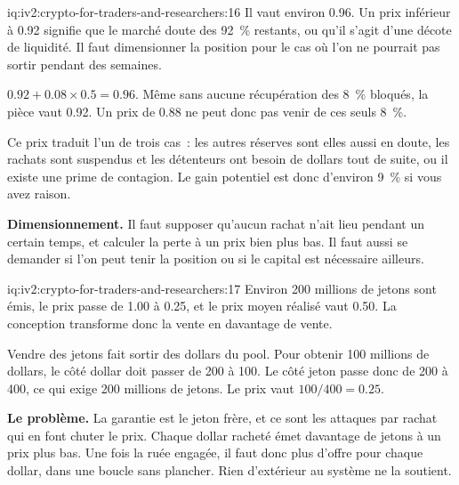 \begin{solution}{iq:iv2:crypto-for-traders-and-researchers:16}
Il vaut environ 0.96. Un prix inférieur à 0.92 signifie que le marché doute des 92~\% restants, ou qu'il s'agit d'une décote de liquidité. Il faut dimensionner la position pour le cas où l'on ne pourrait pas sortir pendant des semaines.

$0.92 + 0.08 \times 0.5 = 0.96$. Même sans aucune récupération des 8~\% bloqués, la pièce vaut 0.92. Un prix de 0.88 ne peut donc pas venir de ces seuls 8~\%.

Ce prix traduit l'un de trois cas~: les autres réserves sont elles aussi en doute, les rachats sont suspendus et les détenteurs ont besoin de dollars tout de suite, ou il existe une prime de contagion. Le gain potentiel est donc d'environ 9~\% si vous avez raison.

\textbf{Dimensionnement.} Il faut supposer qu'aucun rachat n'ait lieu pendant un certain temps, et calculer la perte à un prix bien plus bas. Il faut aussi se demander si l'on peut tenir la position ou si le capital est nécessaire ailleurs.

\end{solution}

\begin{solution}{iq:iv2:crypto-for-traders-and-researchers:17}
Environ 200 millions de jetons sont émis, le prix passe de 1.00 à 0.25, et le prix moyen réalisé vaut 0.50. La conception transforme donc la vente en davantage de vente.

Vendre des jetons fait sortir des dollars du pool. Pour obtenir 100 millions de dollars, le côté dollar doit passer de 200 à 100. Le côté jeton passe donc de 200 à 400, ce qui exige 200 millions de jetons. Le prix vaut $100/400 = 0.25$.

\textbf{Le problème.} La garantie est le jeton frère, et ce sont les attaques par rachat qui en font chuter le prix. Chaque dollar racheté émet davantage de jetons à un prix plus bas. Une fois la ruée engagée, il faut donc plus d'offre pour chaque dollar, dans une boucle sans plancher. Rien d'extérieur au système ne la soutient.

\end{solution}

